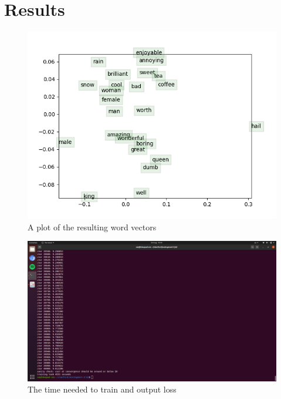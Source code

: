 \documentclass{article}
\begin{document}
\section{Results}
\begin{figure}[h]
	\centering
	\includegraphics[scale=0.5]{images/word_vectors.png}
	\caption{A plot of the resulting word vectors}
\end{figure}
\begin{figure}[h]
	\centering
	\includegraphics[scale=0.2]{images/time_and_loss.png}
	\caption{The time needed to train and output loss}
\end{figure}
\end{document}
